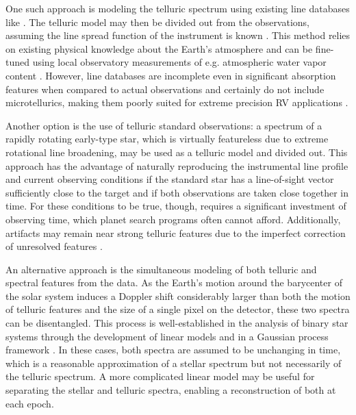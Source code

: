 \documentclass[modern]{aastex62}
\begin{document}
One such approach is modeling the telluric spectrum using existing line databases like  \citep{HITRAN2016}. 
The telluric model may then be divided out from the observations, assuming the line spread function of the instrument is known \citep[e.g.][]{Seifahrt2010}. 
This method relies on existing physical knowledge about the Earth's atmosphere and can be fine-tuned using local observatory measurements of e.g. atmospheric water vapor content \citep{Baker2017}. 
However, line databases are incomplete even in significant absorption features when compared to actual observations and certainly do not include microtellurics, making them poorly suited for extreme precision RV applications \citep{Bertaux2014}.

Another option is the use of telluric standard observations: a spectrum of a rapidly rotating early-type star, which is virtually featureless due to extreme rotational line broadening, may be used as a telluric model and divided out. 
This approach has the advantage of naturally reproducing the instrumental line profile and current observing conditions if the standard star has a line-of-sight vector sufficiently close to the target and if both observations are taken close together in time. 
For these conditions to be true, though, requires a significant investment of observing time, which planet search programs often cannot afford. 
Additionally, artifacts may remain near strong telluric features due to the imperfect correction of unresolved features \citep{Bailey2007}.

An alternative approach is the simultaneous modeling of both telluric and spectral features from the data. 
As the Earth's motion around the barycenter of the solar system induces a Doppler shift considerably larger than both the motion of telluric features and the size of a single pixel on the detector, these two spectra can be disentangled.
This process is well-established in the analysis of binary star systems through the development of linear models
\citep[e.g.][]{Simon1994} and in a Gaussian process framework \citep{Czekala2017}.
In these cases, both spectra are assumed to be unchanging in time, which is a reasonable approximation of a stellar spectrum but not necessarily of the telluric spectrum.
A more complicated linear model may be useful for separating the stellar and telluric spectra, enabling a reconstruction of both at each epoch.

\end{document}
